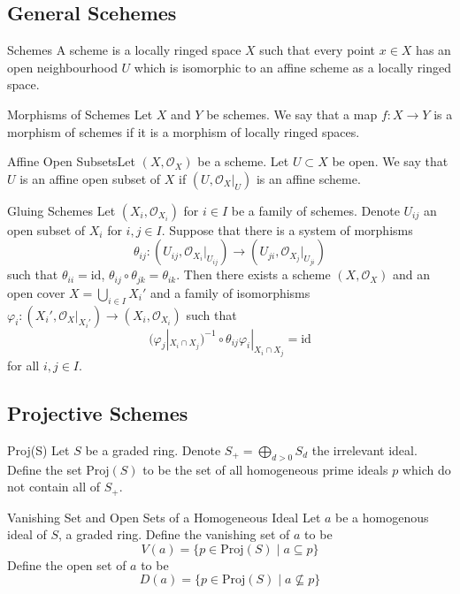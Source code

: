\documentclass[a4paper]{article}
\begin{document}
\subsection{General Scehemes}
\begin{defn}{Schemes}{} A scheme is a locally ringed space $X$ such that every point $x\in X$ has an open neighbourhood $U$ which is isomorphic to an affine scheme as a locally ringed space. 
\end{defn}

\begin{defn}{Morphisms of Schemes}{} Let $X$ and $Y$ be schemes. We say that a map $f:X\to Y$ is a morphism of schemes if it is a morphism of locally ringed spaces. 
\end{defn}

\begin{defn}{Affine Open Subsets}{}Let $(X,\mathcal{O}_X)$ be a scheme. Let $U\subset X$ be open.  We say that $U$ is an affine open subset of $X$ if $(U,\mathcal{O}_X|_U)$ is an affine scheme. 
\end{defn}

\begin{thm}{Gluing Schemes}{} Let $(X_i,\mathcal{O}_{X_i})$ for $i\in I$ be a family of schemes. Denote $U_{ij}$ an open subset of $X_i$ for $i,j\in I$. Suppose that there is a system of morphisms $$\theta_{ij}:(U_{ij},\mathcal{O}_{X_i}|_{U_{ij}})\to(U_{ji},\mathcal{O}_{X_j}|_{U_{ji}})$$ such that $\theta_{ii}=\text{id}$, $\theta_{ij}\circ\theta_{jk}=\theta_{ik}$. Then there exists a scheme $(X,\mathcal{O}_X)$ and an open cover $X=\bigcup_{i\in I}X_i'$ and a family of isomorphisms $\varphi_i:(X_i',\mathcal{O}_X|_{X_i'})\to(X_i,\mathcal{O}_{X_i})$ such that $$(\varphi_j|_{X_i\cap X_j})^{-1}\circ\theta_{ij}\varphi_i|_{X_i\cap X_j}=\text{id}$$ for all $i,j\in I$. 
\end{thm}

\subsection{Projective Schemes}
\begin{defn}{Proj(S)}{} Let $S$ be a graded ring. Denote $S_+=\bigoplus_{d>0}S_d$ the irrelevant ideal. Define the set $\text{Proj}(S)$ to be the set of all homogeneous prime ideals $p$ which do not contain all of $S_+$. 
\end{defn}

\begin{defn}{Vanishing Set and Open Sets of a Homogeneous Ideal}{} Let $a$ be a homogenous ideal of $S$, a graded ring. Define the vanishing set of $a$ to be $$V(a)=\{p\in\text{Proj}(S)\;|\;a\subseteq p\}$$ Define the open set of $a$ to be $$D(a)=\{p\in\text{Proj}(S)\;|\;a\not\subseteq p\}$$
\end{defn}
\end{document}
